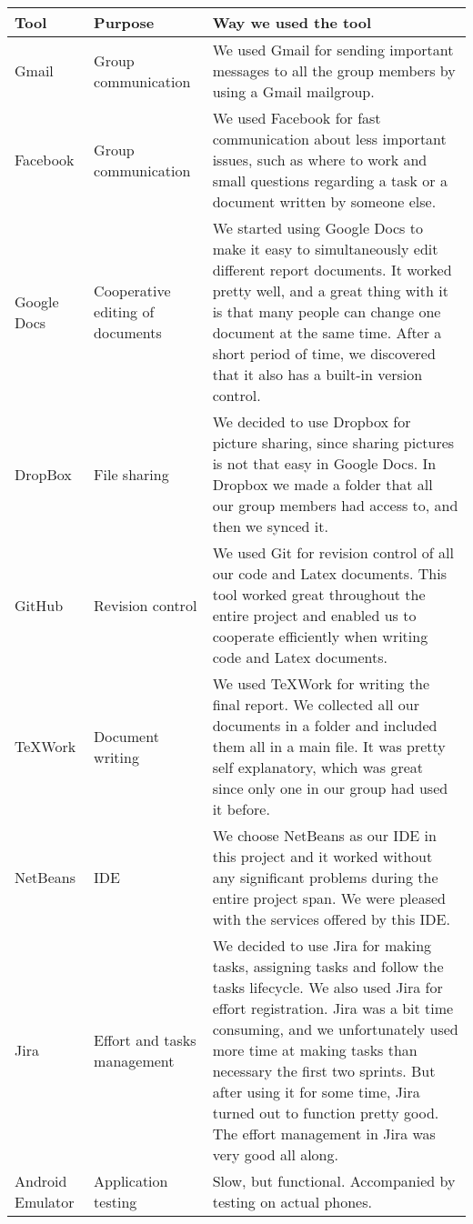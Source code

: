 \begin{tabularx}{\linewidth}{>{\setlength\hsize{.3\hsize}}X|>{\setlength\hsize{0.5\hsize}}X|>{\setlength\hsize{1\hsize}}X}
\hline
\textbf{Tool} & \textbf{Purpose} & \textbf{Way we used the tool} \\ \hline \hline

Gmail & Group communication &We used Gmail for sending important messages to all the group members by using a Gmail mailgroup.\\ \hline

Facebook & Group communication &We used Facebook for fast communication about less important issues, such as where to work and small questions regarding a task or a document written by someone else.\\ \hline

Google Docs &Cooperative editing of documents &We started using Google Docs to make it easy to simultaneously edit different report documents. It worked pretty well, and a great thing with it is that many people can change one document at the same time. After a short period of time, we discovered that it also has a built-in version control.\\ \hline

DropBox & File sharing &We decided to use Dropbox for picture sharing, since sharing pictures is not that easy in Google Docs. In Dropbox we made a folder that all our group members had access to, and then we synced it.\\ \hline

GitHub &  Revision control&We used Git for revision control of all our code and Latex documents. This tool worked great throughout the entire project and enabled us to cooperate efficiently when writing code and Latex documents.\\ \hline

TeXWork & Document writing &We used TeXWork for writing the final report. We collected all our documents in a folder and included them all in a main file. It was pretty self explanatory, which was great since only one in our group had used it before.\\ \hline

NetBeans & IDE & We choose NetBeans as our IDE in this project and it worked without any significant problems during the entire project span. We were pleased with the services offered by this IDE.\\ \hline

Jira& Effort and tasks management&We decided to use Jira for making tasks, assigning tasks and follow the tasks lifecycle. We also used Jira for effort registration. Jira was a bit time consuming, and we unfortunately used more time at making tasks than necessary the first two sprints. But after using it for some time, Jira turned out to function pretty good. The effort management in Jira was very good all along. \\ \hline

Android Emulator &Application testing & Slow, but functional. Accompanied by testing on actual phones.\\ \hline

\end{tabularx}
	
